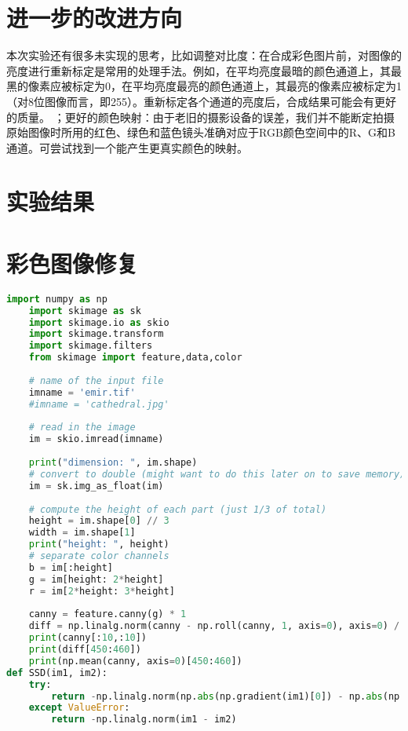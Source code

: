 \documentclass[withoutpreface,bwprint]{cumcmthesis} %
\begin{document}
\section{进一步的改进方向}

本次实验还有很多未实现的思考，比如调整对比度：在合成彩色图片前，对图像的亮度进行重新标定是常用的处理手法。例如，在平均亮度最暗的颜色通道上，其最黑的像素应被标定为0，在平均亮度最亮的颜色通道上，其最亮的像素应被标定为1（对8位图像而言，即255）。重新标定各个通道的亮度后，合成结果可能会有更好的质量。
；更好的颜色映射：由于老旧的摄影设备的误差，我们并不能断定拍摄原始图像时所用的红色、绿色和蓝色镜头准确对应于RGB颜色空间中的R、G和B通道。可尝试找到一个能产生更真实颜色的映射。


\begin{appendices}
\section{实验结果}

\section{彩色图像修复}
\begin{lstlisting}[language=python]
    import numpy as np
    import skimage as sk
    import skimage.io as skio
    import skimage.transform
    import skimage.filters
    from skimage import feature,data,color
    
    # name of the input file
    imname = 'emir.tif'
    #imname = 'cathedral.jpg'
    
    # read in the image
    im = skio.imread(imname)
    
    print("dimension: ", im.shape)
    # convert to double (might want to do this later on to save memory)    
    im = sk.img_as_float(im)
    
    # compute the height of each part (just 1/3 of total)
    height = im.shape[0] // 3
    width = im.shape[1]
    print("height: ", height)
    # separate color channels
    b = im[:height]
    g = im[height: 2*height]
    r = im[2*height: 3*height]
    
    canny = feature.canny(g) * 1
    diff = np.linalg.norm(canny - np.roll(canny, 1, axis=0), axis=0) / height
    print(canny[:10,:10])
    print(diff[450:460])
    print(np.mean(canny, axis=0)[450:460])
def SSD(im1, im2):
	try:
		return -np.linalg.norm(np.abs(np.gradient(im1)[0]) - np.abs(np.gradient(im2)[0])) - np.linalg.norm(np.abs(np.gradient(im1)[1]) - np.abs(np.gradient(im2)[1]))
	except ValueError:
		return -np.linalg.norm(im1 - im2)


\end{lstlisting}
\end{appendices}
\end{document}
